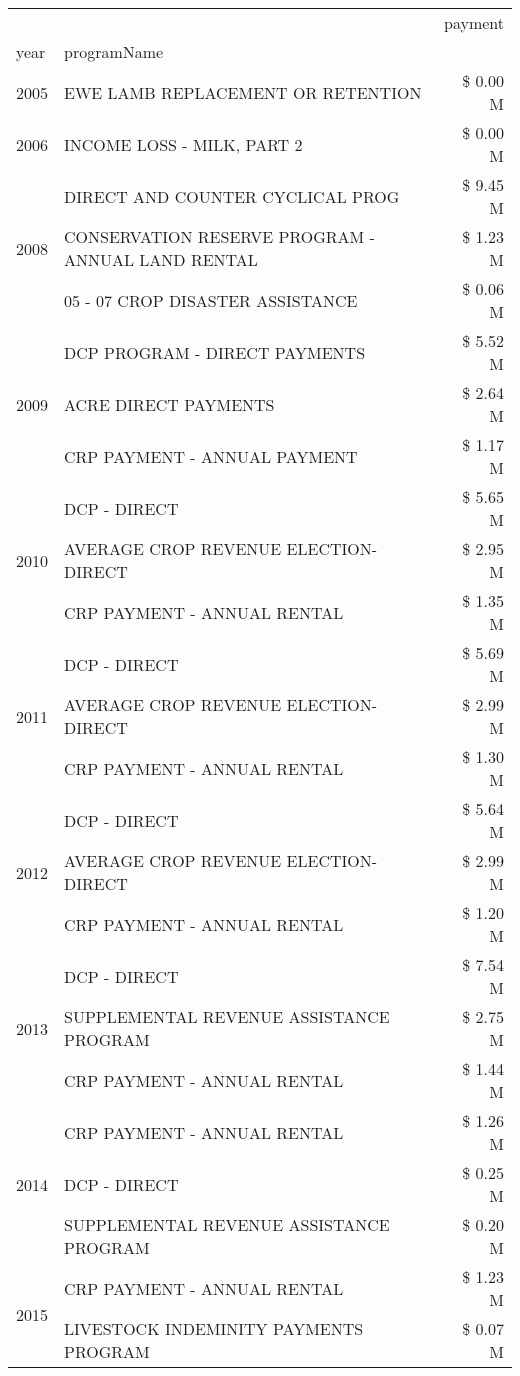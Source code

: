 \begin{tabular}{llr}
\toprule
 &  & payment \\
year & programName &  \\
\midrule
2005 & EWE LAMB REPLACEMENT OR RETENTION & \$ 0.00 M \\
\cline{1-3}
2006 & INCOME LOSS - MILK, PART 2 & \$ 0.00 M \\
\cline{1-3}
\multirow[t]{3}{*}{2008} & DIRECT AND COUNTER CYCLICAL PROG & \$ 9.45 M \\
 & CONSERVATION RESERVE PROGRAM - ANNUAL LAND RENTAL & \$ 1.23 M \\
 & 05 - 07 CROP DISASTER ASSISTANCE & \$ 0.06 M \\
\cline{1-3}
\multirow[t]{3}{*}{2009} & DCP PROGRAM - DIRECT PAYMENTS & \$ 5.52 M \\
 & ACRE DIRECT PAYMENTS & \$ 2.64 M \\
 & CRP PAYMENT - ANNUAL PAYMENT & \$ 1.17 M \\
\cline{1-3}
\multirow[t]{3}{*}{2010} & DCP - DIRECT & \$ 5.65 M \\
 & AVERAGE CROP REVENUE ELECTION-DIRECT & \$ 2.95 M \\
 & CRP PAYMENT - ANNUAL RENTAL & \$ 1.35 M \\
\cline{1-3}
\multirow[t]{3}{*}{2011} & DCP - DIRECT & \$ 5.69 M \\
 & AVERAGE CROP REVENUE ELECTION-DIRECT & \$ 2.99 M \\
 & CRP PAYMENT - ANNUAL RENTAL & \$ 1.30 M \\
\cline{1-3}
\multirow[t]{3}{*}{2012} & DCP - DIRECT & \$ 5.64 M \\
 & AVERAGE CROP REVENUE ELECTION-DIRECT & \$ 2.99 M \\
 & CRP PAYMENT - ANNUAL RENTAL & \$ 1.20 M \\
\cline{1-3}
\multirow[t]{3}{*}{2013} & DCP - DIRECT & \$ 7.54 M \\
 & SUPPLEMENTAL REVENUE ASSISTANCE PROGRAM & \$ 2.75 M \\
 & CRP PAYMENT - ANNUAL RENTAL & \$ 1.44 M \\
\cline{1-3}
\multirow[t]{3}{*}{2014} & CRP PAYMENT - ANNUAL RENTAL & \$ 1.26 M \\
 & DCP - DIRECT & \$ 0.25 M \\
 & SUPPLEMENTAL REVENUE ASSISTANCE PROGRAM & \$ 0.20 M \\
\cline{1-3}
\multirow[t]{3}{*}{2015} & CRP PAYMENT - ANNUAL RENTAL & \$ 1.23 M \\
 & LIVESTOCK INDEMINITY PAYMENTS PROGRAM & \$ 0.07 M \\

\end{tabular}
